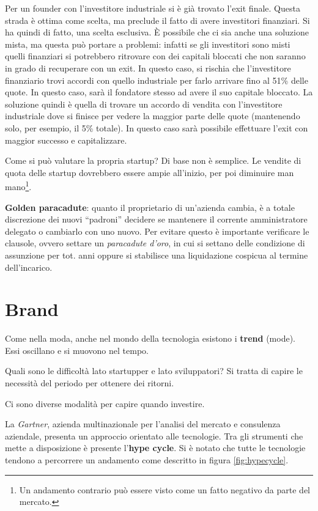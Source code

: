 Per un founder con l'investitore industriale si è già trovato l'exit finale.
Questa strada è ottima come scelta, ma preclude il fatto di avere investitori
finanziari. Si ha quindi di fatto, una scelta esclusiva.
È possibile che ci sia anche una soluzione mista, ma questa può portare a
problemi: infatti se gli investitori sono misti quelli finanziari si potrebbero
ritrovare con dei capitali bloccati che non saranno in grado di recuperare con
un exit. In questo caso, si rischia che l'investitore finanziario trovi accordi
con quello industriale per farlo arrivare fino al 51\% delle quote. In questo
caso, sarà il fondatore stesso ad avere il suo capitale bloccato. La soluzione
quindi è quella di trovare un accordo di vendita con l'investitore industriale
dove si finisce per vedere la maggior parte delle quote (mantenendo solo, per
esempio, il 5\% totale). In questo caso sarà possibile effettuare l'exit con
maggior successo e capitalizzare.

Come si può valutare la propria startup? Di base non è semplice. Le vendite di
quota delle startup dovrebbero essere ampie all'inizio, per poi diminuire man
mano\footnote{Un andamento contrario può essere visto come un fatto negativo da
parte del mercato.}.

\textbf{Golden paracadute}: quanto il proprietario di un'azienda cambia, è a
totale discrezione dei nuovi ``padroni'' decidere se mantenere il corrente
amministratore delegato o cambiarlo con uno nuovo. Per evitare questo è
importante verificare le clausole, ovvero settare un \textit{paracadute d'oro},
in cui si settano delle condizione di assunzione per tot. anni oppure si
stabilisce una liquidazione cospicua al termine dell'incarico.

\chapter{Brand}

Come nella moda, anche nel mondo della tecnologia esistono i \textbf{trend}
(mode). Essi oscillano e si muovono nel tempo.

Quali sono le difficoltà lato startupper e lato sviluppatori? Si tratta di
capire le necessità del periodo per ottenere dei ritorni.

Ci sono diverse modalità per capire quando investire.

La \textit{Gartner}, azienda multinazionale per l'analisi del mercato e
consulenza aziendale, presenta un approccio orientato alle tecnologie. Tra gli
strumenti che mette a disposizione è presente l'\textbf{hype cycle}.
Si è notato che tutte le tecnologie tendono a percorrere un andamento come
descritto in figura \ref{fig:hypecycle}.

